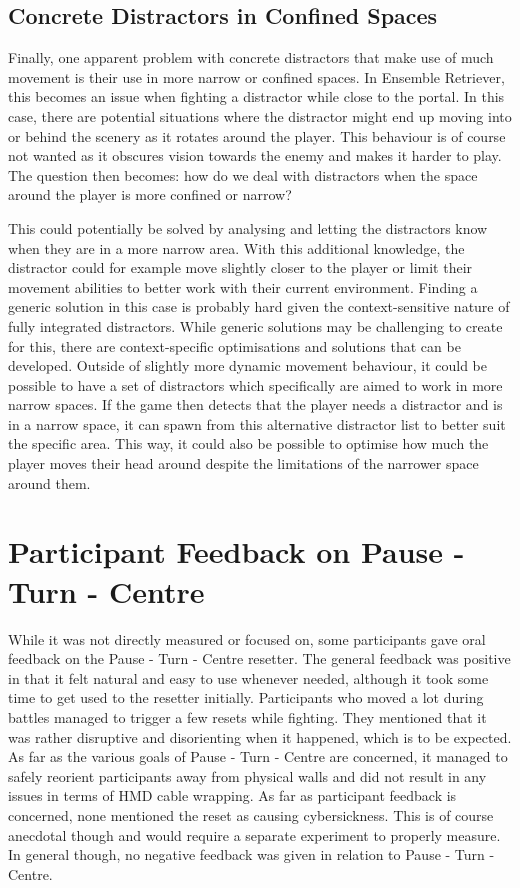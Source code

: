 \subsection{Concrete Distractors in Confined Spaces}
Finally, one apparent problem with concrete distractors that make use of much movement is their use in more narrow or confined spaces. In Ensemble Retriever, this becomes an issue when fighting a distractor while close to the portal. In this case, there are potential situations where the distractor might end up moving into or behind the scenery as it rotates around the player. This behaviour is of course not wanted as it obscures vision towards the enemy and makes it harder to play. The question then becomes: how do we deal with distractors when the space around the player is more confined or narrow?

This could potentially be solved by analysing and letting the distractors know when they are in a more narrow area. With this additional knowledge, the distractor could for example move slightly closer to the player or limit their movement abilities to better work with their current environment. Finding a generic solution in this case is probably hard given the context-sensitive nature of fully integrated distractors. While generic solutions may be challenging to create for this, there are context-specific optimisations and solutions that can be developed. Outside of slightly more dynamic movement behaviour, it could be possible to have a set of distractors which specifically are aimed to work in more narrow spaces. If the game then detects that the player needs a distractor and is in a narrow space, it can spawn from this alternative distractor list to better suit the specific area. This way, it could also be possible to optimise how much the player moves their head around despite the limitations of the narrower space around them. 
            
\section{Participant Feedback on Pause - Turn - Centre}
While it was not directly measured or focused on, some participants gave oral feedback on the Pause - Turn - Centre resetter. The general feedback was positive in that it felt natural and easy to use whenever needed, although it took some time to get used to the resetter initially. Participants who moved a lot during battles managed to trigger a few resets while fighting. They mentioned that it was rather disruptive and disorienting when it happened, which is to be expected. As far as the various goals of Pause - Turn - Centre are concerned, it managed to safely reorient participants away from physical walls and did not result in any issues in terms of HMD cable wrapping. As far as participant feedback is concerned, none mentioned the reset as causing cybersickness. This is of course anecdotal though and would require a separate experiment to properly measure. In general though, no negative feedback was given in relation to Pause - Turn - Centre. 